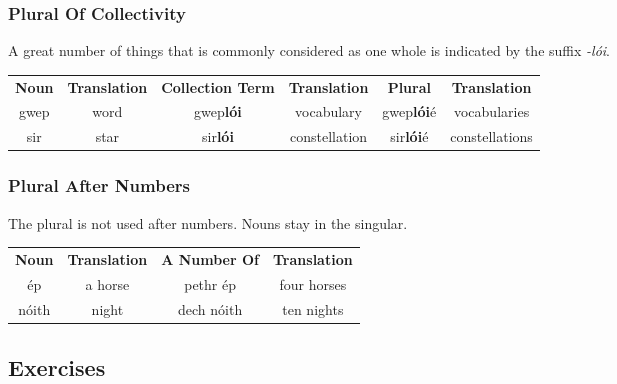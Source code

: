 \subsubsection{Plural Of Collectivity}

A great number of things that is commonly considered as one whole is indicated by the suffix \textit{-l\'{o}i}.
\begin{table}[H]
\centering
\begin{tabular}{cccccc}
  \toprule
  \textbf{Noun} & \textbf{Translation} & \textbf{Collection Term} & \textbf{Translation} & \textbf{Plural} & \textbf{Translation}\\
  \cmidrule(lr){1-1}\cmidrule(lr){2-2}\cmidrule(lr){3-3}\cmidrule(lr){4-4}\cmidrule(lr){5-5}\cmidrule(lr){6-6}
  gwep & word & gwep\textbf{l\'{o}i} & vocabulary & gwep\textbf{l\'{o}i}\'{e} & vocabularies\\
  sir & star & sir\textbf{l\'{o}i} & constellation & sir\textbf{l\'{o}i}\'{e} & constellations\\
  \bottomrule
\end{tabular}
\label{example_plural_one_whole}
\end{table}

\subsubsection{Plural After Numbers}

The plural is not used after numbers. Nouns stay in the singular.
\begin{table}[H]
\centering
\begin{tabular}{cccc}
  \toprule
  \textbf{Noun} & \textbf{Translation} & \textbf{A Number Of} & \textbf{Translation}\\
  \cmidrule(lr){1-1}\cmidrule(lr){2-2}\cmidrule(lr){3-3}\cmidrule(lr){4-4}
  \'{e}p & a horse & pethr \'{e}p & four horses\\
  n\'{o}ith & night & dech n\'{o}ith & ten nights\\
  \bottomrule
\end{tabular}
\label{example_plural_one_whole}
\end{table}

\newpage
\subsection{Exercises}

